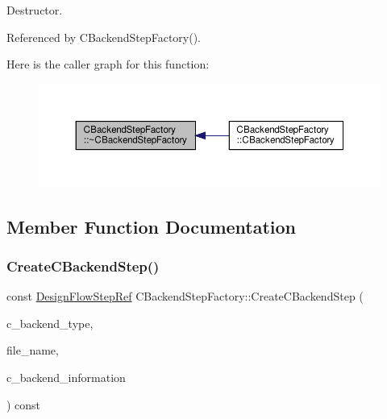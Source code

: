 Destructor. 



Referenced by C\+Backend\+Step\+Factory().

Here is the caller graph for this function\+:
\nopagebreak
\begin{figure}[H]
\begin{center}
\leavevmode
\includegraphics[width=350pt]{d9/d16/classCBackendStepFactory_aa1e12def0da538e05942f60146729316_icgraph}
\end{center}
\end{figure}


\subsection{Member Function Documentation}
\mbox{\label{classCBackendStepFactory_a365dcca2ec7520ef2345ece5797fc8b4}} 
\subsubsection{\texorpdfstring{Create\+C\+Backend\+Step()}{CreateCBackendStep()}}
{\footnotesize\ttfamily const \hyperlink{design__flow__step_8hpp_a9dd6b4474ddf52d41a78b1aaa12ae6c8}{Design\+Flow\+Step\+Ref} C\+Backend\+Step\+Factory\+::\+Create\+C\+Backend\+Step (\begin{DoxyParamCaption}\item[{const \hyperlink{classCBackend_abadfd9ef309ba4d12e648fe2e3fff08b}{C\+Backend\+::\+Type}}]{c\+\_\+backend\+\_\+type,  }\item[{const std\+::string \&}]{file\+\_\+name,  }\item[{const \hyperlink{c__backend__information_8hpp_affe03f2ae5a23aa0efcd9d958c85280d}{C\+Backend\+Information\+Const\+Ref}}]{c\+\_\+backend\+\_\+information }\end{DoxyParamCaption}) const}



